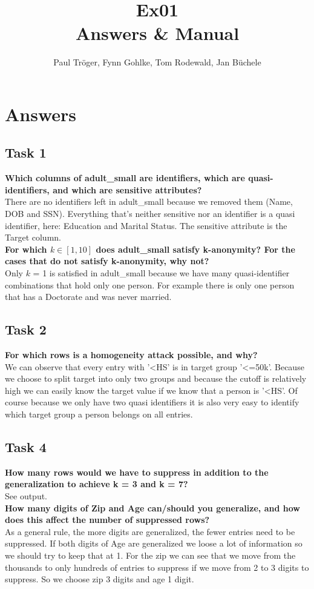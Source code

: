 \documentclass{article}
\begin{document}
	
	\title{Ex01 \\ Answers \& Manual}
	\author{Paul Tr\"oger, Fynn Gohlke, Tom Rodewald, Jan B\"uchele}
	
	\maketitle
	
	\section{Answers}
		\subsection{Task 1}
			\textbf{Which columns of adult\_small are identifiers, which are quasi-identifiers, and which are sensitive attributes?}\\
			There are no identifiers left in adult\_small because we removed them (Name, DOB and SSN).
			Everything that's neither sensitive nor an identifier is a quasi identifier, here: Education and Marital Status.
			The sensitive attribute is the Target column.\\
			\textbf{For which $k \in [1, 10]$ does adult\_small satisfy k-anonymity? For the cases that do not satisfy k-anonymity, why not?}\\
			Only $k$ = 1 is satisfied in adult\_small because we have many quasi-identifier combinations that hold only one person.
			For example there is only one person that has a Doctorate and was never married.
		\subsection{Task 2}
			\textbf{For which rows is a homogeneity attack possible, and why?}\\
			We can observe that every entry with  '<HS' is in target group '<=50k'.
			Because we choose to split target into only two groups and because the cutoff is relatively high we can easily know the target value if we know that a person is '<HS'. Of course because we only have two quasi identifiers it is also very easy to identify which target group a person belongs on all entries.
		\subsection{Task 4}
			\textbf{How many rows would we have to suppress in addition to the generalization to achieve k = 3 and k = 7?}\\
			See output.\\
			\textbf{How many digits of Zip and Age can/should you generalize, and how does this affect the number of suppressed rows?}\\
			As a general rule, the more digits are generalized, the fewer entries need to be suppressed.
			If both digits of Age are generalized we loose a lot of information so we should try to keep that at 1.
			For the zip we can see that we move from the thousands to only hundreds of entries to suppress if we move from 2 to 3 digits to suppress.
			So we choose zip 3 digits and age 1 digit.  
\end{document}

